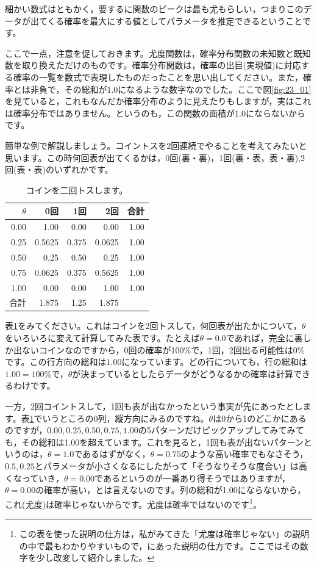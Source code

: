 \documentclass{ltjsbook}
\begin{document}
細かい数式はともかく，要するに関数のピークは最も尤もらしい，つまりこのデータが出てくる確率を最大にする値としてパラメータを推定できるということです。

ここで一点，注意を促しておきます。尤度関数は，確率分布関数の未知数と既知数を取り換えただけのものです。確率分布関数は，確率の出目(実現値)に対応する確率の一覧を数式で表現したものだったことを思い出してください。また，確率とは非負で，その総和が1.0になるような数字なのでした。ここで図\ref{fig:23_01}を見ていると，これもなんだか確率分布のように見えたりもしますが，実はこれは確率分布ではありません。というのも，この関数の面積が1.0にならないからです。

簡単な例で解説しましょう。コイントスを2回連続でやることを考えてみたいと思います。この時何回表が出てくるかは，0回(裏・裏)，1回(裏・表，表・裏),2回(表・表)のいずれかです。

\begin{table}[ht]
	\centering
	\caption{コインを二回トスします。}
	\begin{tabular}{rrrrr}
		\hline
		$\theta$ & 0回     & 1回    & 2回     & 合計   \\
		\hline
		0.00     & 1.00   & 0.00  & 0.00   & 1.00 \\
		0.25     & 0.5625 & 0.375 & 0.0625 & 1.00 \\
		0.50     & 0.25   & 0.50  & 0.25   & 1.00 \\
		0.75     & 0.0625 & 0.375 & 0.5625 & 1.00 \\
		1.00     & 0.00   & 0.00  & 1.00   & 1.00 \\
		\hline
		合計       & 1.875 & 1.25 & 1.875 &      \\
		\hline
	\end{tabular}
	\label{tbl:23_01}
\end{table}

表\ref{tbl:23_01}をみてください。これはコインを2回トスして，何回表が出たかについて，$\theta$をいろいろに変えて計算してみた表です。たとえば$\theta=0.0$であれば，完全に裏しか出ないコインなのですから，0回の確率が100\%で，1回，2回出る可能性は0\%です。この行方向の総和は$1.00$になっています。どの行についても，行の総和は$1.00=100\%$で，$\theta$が決まっているとしたらデータがどうなるかの確率は計算できるわけです。

一方，2回コイントスして，1回も表が出なかったという事実が先にあったとします。表\ref{tbl:23_01}でいうところの0列，縦方向にみるのですね。$\theta$は0から1のどこかにあるのですが，$0.00,0.25,0.50,0.75,1.00$の5パターンだけピックアップしてみてみても，その総和は1.00を超えています。これを見ると，1回も表が出ないパターンというのは，$\theta=1.0$であるはずがなく，$\theta=0.75$のような高い確率でもなさそう，$0.5,0.25$とパラメータが小さくなるにしたがって「そうなりそうな度合い」は高くなっていき，$\theta=0.00$であるというのが一番あり得そうではありますが，$\theta=0.00$の確率が高い，とは言えないのです。列の総和が1.00にならないから，これ(尤度)は確率じゃないからです。尤度は確率ではないのです\footnote{この表を使った説明の仕方は，私がみてきた「尤度は確率じゃない」の説明の中で最もわかりやすいもので，\textcite{Lambert201805}にあった説明の仕方です。ここではその数字を少し改変して紹介しました。}。
\end{document}
